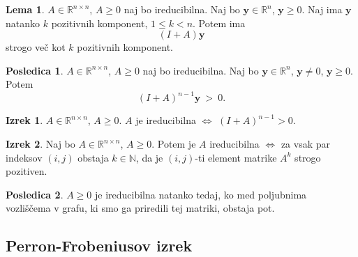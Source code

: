 \documentclass[11pt]{article}
\newcommand{\R}{\mathbb{R}}
\newcommand{\N}{\mathbb{N}}
\newcommand{\y}{\mathbf{y}}
\newcommand{\0}{\mathbf{0}}
\theoremstyle{definition}
\theoremstyle{definition}
\theoremstyle{definition}
\newtheorem{izrek}{Izrek}[section]
\theoremstyle{definition}
\newtheorem*{posledica}{Posledica}
\newtheorem{lema}{Lema}
\begin{document}
\begin{lema}

$A \in \R^{n \times n}$, $A \geq 0$ naj bo ireducibilna. Naj bo $\y \in \R^n$, $\y \geq 0$. Naj ima $\y$ natanko $k$ pozitivnih komponent, $1 \leq k < n$. Potem ima 
$$(I+A)\y$$ 
strogo več kot $k$ pozitivnih komponent.

\end{lema}
\vspace{0.5cm}

\begin{posledica}

$A \in \R^{n \times n}$, $A \geq 0$ naj bo ireducibilna. Naj bo $\y \in \R^n$, $\y \neq 0$, $\y \geq 0$. Potem
$$(I+A)^{n-1}\y ~>~ 0.$$

\end{posledica}
\vspace{0.5cm}

\begin{izrek}

$A \in \R^{n \times n}$, $A \geq 0$. $A$ je ireducibilna $\iff$ $(I+A)^{n-1} > 0$.

\end{izrek}
\vspace{0.5cm}

\begin{izrek}

Naj bo $A \in \R^{n \times n}$, $A \geq 0$. Potem je $A$ ireducibilna $\iff$ za vsak par indeksov $(i,j)$ obstaja $k \in \N$, da je $(i,j)$-ti element matrike $A^k$ strogo pozitiven.

\end{izrek}
\vspace{0.5cm}

\begin{posledica}

$A \geq 0$ je ireducibilna natanko tedaj, ko med poljubnima \\vozliščema v grafu, ki smo ga priredili tej matriki, obstaja pot.

\end{posledica}
\vspace{0.5cm}


\subsection{Perron-Frobeniusov izrek}
\vspace{0.5cm}
\end{document}
